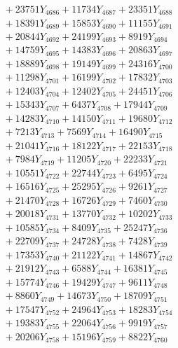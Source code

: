 \documentclass[a4paper,10pt]{article}
\begin{document}
{\begin{align}
&\;  + 23751 Y_{4686} + 11734 Y_{4687} + 23351 Y_{4688} \\[0.3ex]
&\;  + 18391 Y_{4689} + 15853 Y_{4690} + 11155 Y_{4691} \\[0.3ex]
&\;  + 20844 Y_{4692} + 24199 Y_{4693} + 8919 Y_{4694} \\[0.3ex]
&\;  + 14759 Y_{4695} + 14383 Y_{4696} + 20863 Y_{4697} \\[0.3ex]
&\;  + 18889 Y_{4698} + 19149 Y_{4699} + 24316 Y_{4700} \\[0.3ex]
&\;  + 11298 Y_{4701} + 16199 Y_{4702} + 17832 Y_{4703} \\[0.3ex]
&\;  + 12403 Y_{4704} + 12402 Y_{4705} + 24451 Y_{4706} \\[0.3ex]
&\;  + 15343 Y_{4707} + 6437 Y_{4708} + 17944 Y_{4709} \\[0.5ex]\allowbreak
&\;  + 14283 Y_{4710} + 14150 Y_{4711} + 19680 Y_{4712} \\[0.3ex]
&\;  + 7213 Y_{4713} + 7569 Y_{4714} + 16490 Y_{4715} \\[0.3ex]
&\;  + 21041 Y_{4716} + 18122 Y_{4717} + 22153 Y_{4718} \\[0.3ex]
&\;  + 7984 Y_{4719} + 11205 Y_{4720} + 22233 Y_{4721} \\[0.3ex]
&\;  + 10551 Y_{4722} + 22744 Y_{4723} + 6495 Y_{4724} \\[0.3ex]
&\;  + 16516 Y_{4725} + 25295 Y_{4726} + 9261 Y_{4727} \\[0.3ex]
&\;  + 21470 Y_{4728} + 16726 Y_{4729} + 7460 Y_{4730} \\[0.3ex]
&\;  + 20018 Y_{4731} + 13770 Y_{4732} + 10202 Y_{4733} \\[0.3ex]
&\;  + 10585 Y_{4734} + 8409 Y_{4735} + 25247 Y_{4736} \\[0.3ex]
&\;  + 22709 Y_{4737} + 24728 Y_{4738} + 7428 Y_{4739} \\[0.5ex]\allowbreak
&\;  + 17353 Y_{4740} + 21122 Y_{4741} + 14867 Y_{4742} \\[0.3ex]
&\;  + 21912 Y_{4743} + 6588 Y_{4744} + 16381 Y_{4745} \\[0.3ex]
&\;  + 15774 Y_{4746} + 19429 Y_{4747} + 9611 Y_{4748} \\[0.3ex]
&\;  + 8860 Y_{4749} + 14673 Y_{4750} + 18709 Y_{4751} \\[0.3ex]
&\;  + 17547 Y_{4752} + 24964 Y_{4753} + 18283 Y_{4754} \\[0.3ex]
&\;  + 19383 Y_{4755} + 22064 Y_{4756} + 9919 Y_{4757} \\[0.3ex]
&\;  + 20206 Y_{4758} + 15196 Y_{4759} + 8822 Y_{4760} \\[0.3ex]

\end{align}}
\end{document}
